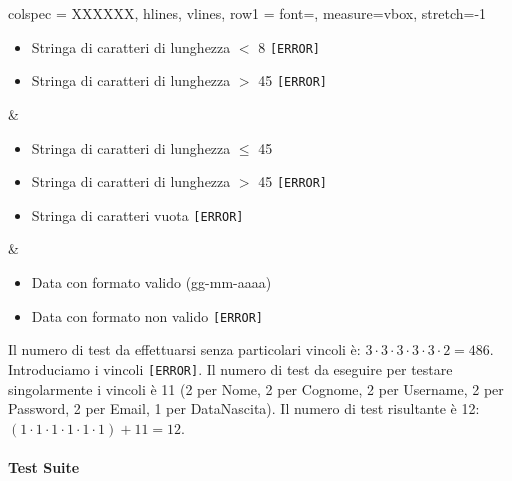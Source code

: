 \begin{table}[h]
\begin{tblr}{
		colspec = XXXXXX,
		hlines, vlines,
		row{1} = {font=\bfseries},
		measure=vbox, stretch=-1
		}
\begin{itemize}[leftmargin=*]
			\item Stringa di caratteri di lunghezza $<$ 8 \texttt{[ERROR]}
			\item Stringa di caratteri di lunghezza $>$ 45 \texttt{[ERROR]}
		\end{itemize} &
		\begin{itemize}[leftmargin=*]
			\item Stringa di caratteri di lunghezza $\leq$ 45
			\item Stringa di caratteri di lunghezza $>$ 45 \texttt{[ERROR]}
			\item Stringa di caratteri vuota \texttt{[ERROR]}
		\end{itemize} &
		\begin{itemize}[leftmargin=*]
			\item Data con formato valido (gg-mm-aaaa)
			\item Data con formato non valido \texttt{[ERROR]}
		\end{itemize}
	\end{tblr}
\end{table}

Il numero di test da effettuarsi senza particolari vincoli è: $3 \cdot 3 \cdot 3 \cdot 3 \cdot 3 \cdot 2 = 486$. Introduciamo i vincoli \texttt{[ERROR]}. Il numero di test da eseguire per testare singolarmente i vincoli è 11 (2 per Nome, 2 per Cognome, 2 per Username, 2 per Password, 2 per Email, 1 per DataNascita). Il numero di test risultante è 12: $(1 \cdot 1 \cdot 1 \cdot 1 \cdot 1 \cdot 1) + 11 = 12$.

\paragraph{Test Suite}

